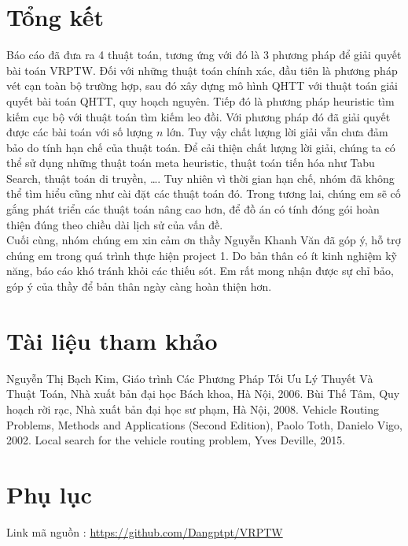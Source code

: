 \documentclass[12pt,a4paper]{article}\author{Nguyễn Nho Dũng}
\let\svsection\section
\def\section{\setcounter{figure}{0}\svsection}
\begin{document}
\section{Tổng kết}
Báo cáo đã đưa ra 4 thuật toán, tương ứng với đó là 3 phương pháp để giải quyết bài toán VRPTW. Đối với những thuật toán chính xác, đầu tiên là phương pháp vét cạn toàn bộ trường hợp, sau đó xây dựng mô hình QHTT với thuật toán giải quyết bài toán QHTT, quy hoạch nguyên. Tiếp đó là phương pháp heuristic tìm kiếm cục bộ với thuật toán tìm kiếm leo đồi. Với phương pháp đó đã giải quyết được các bài toán với số lượng $n$ lớn. Tuy vậy chất lượng lời giải vẫn chưa đảm bảo do tính hạn chế của thuật toán. Để cải thiện chất lượng lời giải, chúng ta có thể sử dụng những thuật toán meta heuristic, thuật toán tiến hóa như Tabu Search, thuật toán di truyền, \ldots. Tuy nhiên vì thời gian hạn chế, nhóm đã không thể tìm hiểu cũng như cài đặt các thuật toán đó. Trong tương lai, chúng em sẽ cố gắng phát triển các thuật toán nâng cao hơn, để đồ án có tính đóng gói hoàn thiện đúng theo chiều dài lịch sử của vấn đề. \\ [5pt]
Cuối cùng, nhóm chúng em xin cảm ơn thầy Nguyễn Khanh Văn đã góp ý, hỗ trợ chúng em trong quá trình thực hiện project 1. Do bản thân có ít kinh nghiệm kỹ năng, báo cáo khó tránh khỏi các thiếu sót. Em rất mong nhận được sự chỉ bảo, góp ý của thầy để bản thân ngày càng hoàn thiện hơn.
\newpage\section{Tài liệu tham khảo}
\begin{thebibliography}{9}
Nguyễn Thị Bạch Kim, Giáo trình Các Phương Pháp Tối Ưu Lý Thuyết Và Thuật Toán, Nhà xuất bản đại học Bách khoa, Hà Nội, 2006. 
Bùi Thế Tâm, Quy hoạch rời rạc, Nhà xuất bản đại học sư phạm, Hà Nội, 2008.
Vehicle Routing Problems, Methods and Applications (Second Edition), Paolo Toth, Danielo Vigo, 2002.
Local search for the vehicle routing problem, Yves Deville, 2015. 
\end{thebibliography}
\section{Phụ lục}
\large Link mã nguồn : \href{https://github.com/Dangptpt/VRPTW}{https://github.com/Dangptpt/VRPTW}
\end{document}
